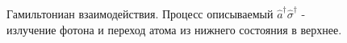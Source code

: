 \begin{figure}
\centering



\caption{Гамильтониан взаимодействия. Процесс описываемый $\hat{a}^{\dag}\hat{\sigma}^{\dag}$ - излучение
  фотона и переход атома из нижнего состояния в верхнее.}
\label{figPart1Ch2_2_4}
\end{figure}
